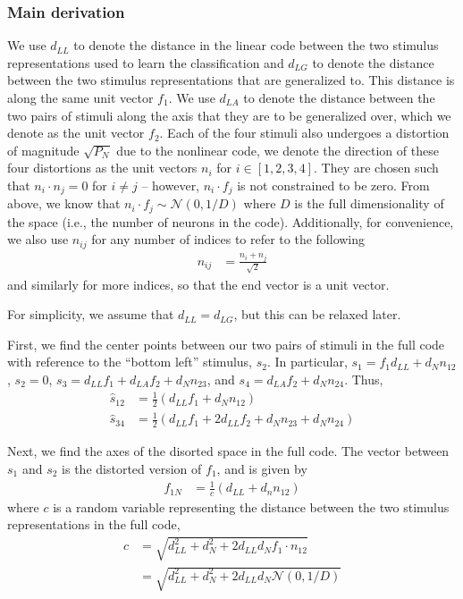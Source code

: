 \documentclass[letter,12pt]{article}
\newcommand{\dll}{d_{LL}}
\newcommand{\dlg}{d_{LG}}
\newcommand{\dla}{d_{LA}}
\newcommand{\dn}{d_{N}}
\newcommand{\dis}{\mathcal{N}(0, 1/D)}
\begin{document}
\subsubsection{Main derivation}
We use $\dll$ to denote the distance in the linear code between the two
stimulus representations used to learn the classification and $\dlg$ to
denote the distance between the two stimulus representations that are generalized
to. This distance is along the same unit vector $f_{1}$. We use $\dla$ to
denote the distance between the two pairs of stimuli along the axis that they are
to be generalized over, which we denote as the unit vector $f_{2}$. Each of the
four stimuli also undergoes a distortion of magnitude $\sqrt{P_{N}}$ due to the
nonlinear code, we denote the direction of these four distortions as the unit
vectors $n_{i}$ for $i \in [1, 2, 3, 4]$. They are chosen such that
$n_{i} \cdot n_{j} = 0$ for $i \ne j$ -- however, $n_{i} \cdot f_{j}$ is not
constrained to be zero. From above, we know that
$n_{i} \cdot f_{j} \sim \dis$ where $D$ is the
full dimensionality of the space (i.e., the number of neurons in the code).
Additionally, for convenience, we also use $n_{ij}$ for any number of indices
to refer to the following
\begin{align}
  n_{ij} &= \frac{n_{i} + n_{j}}{\sqrt{2}}
\end{align}
and similarly for more indices, so that the end vector is a unit vector.

For simplicity, we assume that $\dll = \dlg$, but this can be relaxed later. 

First, we find the center points between our two pairs of stimuli in the full
code with reference to the ``bottom left'' stimulus, $s_{2}$. In particular,
$s_{1} = f_{1} \dll + \dn n_{12}$, $s_{2} = 0$,
$s_{3} = \dll f_{1} + \dla f_{2} + \dn n_{23}$,
and $s_{4} = \dla f_{2} + \dn n_{24}$. Thus, 
\begin{align}
  \hat{s}_{12} &= \frac{1}{2}\left(\dll f_{1} + \dn n_{12}\right) \\
  \hat{s}_{34} &= \frac{1}{2}\left(\dll f_{1} + 2\dll f_{2} + \dn n_{23}
  + \dn n_{24}\right)
\end{align}

Next, we find the axes of the disorted space in the full code. The vector between
$s_{1}$ and $s_{2}$ is the distorted version of $f_{1}$, and is given by
\begin{align}
  f_{1N} &= \frac{1}{c}\left(\dll + d_{n}n_{12}\right)
\end{align}
where $c$ is a random variable representing the distance between the two stimulus
representations in the full code,
\begin{align}
  c &= \sqrt{\dll^{2} + \dn^{2} + 2 \dll \dn f_{1} \cdot n_{12}} \\
  &= \sqrt{\dll^{2} + \dn^{2} + 2 \dll \dn \dis} 
\end{align}
\end{document}
